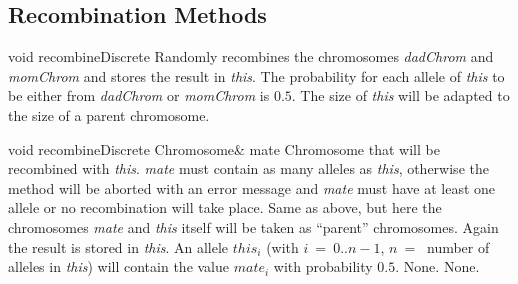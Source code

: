 \subsection{Recombination Methods}

    \setCorrectWidthThree{8pt}
    \printMethodWithParamsSaved
        {void}
        {}
        {recombineDiscrete}
        {Randomly recombines the chromosomes {\em dadChrom} and 
{\em momChrom} and stores the result in {\em this}. The probability for
each allele of {\em this} to be either from {\em dadChrom} or
{\em momChrom} is $0.5$. The size of {\em this} will be
adapted to the size of a parent chromosome.}
        {}
    \setCorrectWidthThree{4pt}

\clearpage

    \printMethodWithOneParam
    {void} 
    {recombineDiscrete}
    {Chromosome\&} 
    {mate}
    {Chromosome that will be recombined with {\em this}. {\em mate} must
contain as many alleles as {\em this}, otherwise the method will be
aborted with an error message and {\em mate} must have at least
one allele or no recombination will take place.} 
    {Same as above, but here the chromosomes {\em mate} and {\em this}
itself will be taken as ``parent'' chromosomes. Again the result is stored
in {\em this}. An allele $this_i$ (with $i\ =\ 0..n-1$, $n\ =\ $ 
number of alleles in {\em this}) will contain the value $mate_i$
with probability $0.5$.}
    {None.}
    {None.}
